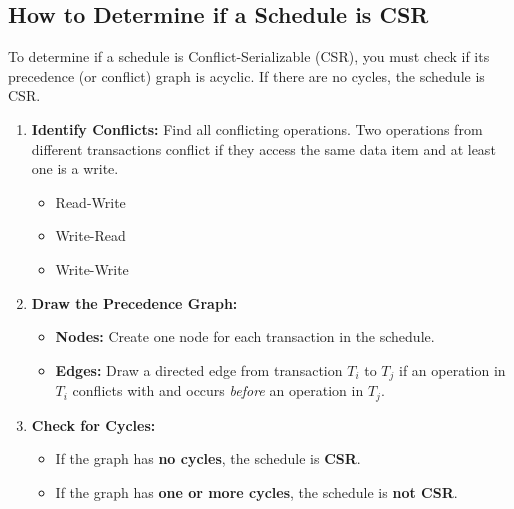 \subsection*{How to Determine if a Schedule is CSR}
To determine if a schedule is Conflict-Serializable (CSR), you must check if its precedence (or conflict) graph is acyclic. If there are no cycles, the schedule is CSR.

\begin{enumerate}
    \item \textbf{Identify Conflicts:} Find all conflicting operations. Two operations from different transactions conflict if they access the same data item and at least one is a write.
    \begin{itemize}
        \item Read-Write
        \item Write-Read
        \item Write-Write
    \end{itemize}

    \item \textbf{Draw the Precedence Graph:}
    \begin{itemize}
        \item \textbf{Nodes:} Create one node for each transaction in the schedule.
        \item \textbf{Edges:} Draw a directed edge from transaction \textbf{$T_i$} to \textbf{$T_j$} if an operation in $T_i$ conflicts with and occurs \textit{before} an operation in $T_j$.
    \end{itemize}

    \item \textbf{Check for Cycles:}
    \begin{itemize}
        \item If the graph has \textbf{no cycles}, the schedule is \textbf{CSR}.
        \item If the graph has \textbf{one or more cycles}, the schedule is \textbf{not CSR}.
    \end{itemize}
\end{enumerate}